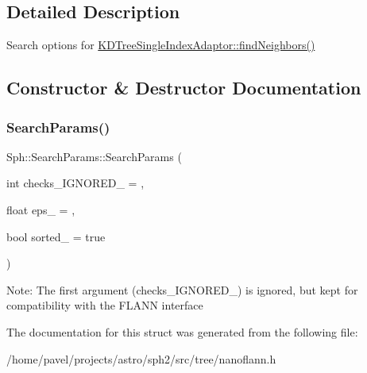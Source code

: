 \subsection{Detailed Description}
Search options for \hyperlink{classSph_1_1KDTreeSingleIndexAdaptor_a444955d9248884e7fcb1fb238c3b0105}{K\+D\+Tree\+Single\+Index\+Adaptor\+::find\+Neighbors()} 

\subsection{Constructor \& Destructor Documentation}
\hypertarget{structSph_1_1SearchParams_a810971e8ebb92129213a5413f5717753}{}\label{structSph_1_1SearchParams_a810971e8ebb92129213a5413f5717753} 
\subsubsection{\texorpdfstring{Search\+Params()}{SearchParams()}}
{\footnotesize\ttfamily Sph\+::\+Search\+Params\+::\+Search\+Params (\begin{DoxyParamCaption}\item[{int}]{checks\+\_\+\+I\+G\+N\+O\+R\+E\+D\+\_\+ = {},  }\item[{float}]{eps\+\_\+ = {},  }\item[{bool}]{sorted\+\_\+ = {\ttfamily true} }\end{DoxyParamCaption})\hspace{0.3cm}{\ttfamily [inline]}}

Note\+: The first argument (checks\+\_\+\+I\+G\+N\+O\+R\+E\+D\+\_\+) is ignored, but kept for compatibility with the F\+L\+A\+NN interface 

The documentation for this struct was generated from the following file\+:\begin{DoxyCompactItemize}
\item 
/home/pavel/projects/astro/sph2/src/tree/nanoflann.\+h\end{DoxyCompactItemize}

